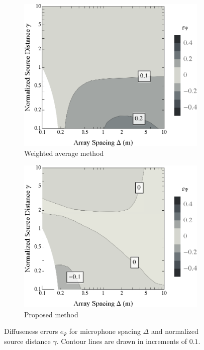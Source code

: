 \begin{figure}[t]
    	\centering
    	\begin{subfigure}[b]{0.49\textwidth}
        		\includegraphics[width=\textwidth]{08_proposed_method/figures/merimaa2005_d_contour_xf.eps}
        		\caption{Weighted average method}
        		\label{fig:08_Proposed_Method:Diffuseness_Errors:XF}
    	\end{subfigure}
	\hfill
	\begin{subfigure}[b]{0.49\textwidth}
        		\includegraphics[width=\textwidth]{08_proposed_method/figures/merimaa2005_d_contour_validhybrid.eps}
        		\caption{Proposed method}
        		\label{fig:08_Proposed_Method:Diffuseness_Errors:Hybrid}
    	\end{subfigure}
	
    	\caption[Contour plots of diffuseness errors for each interpolation method.]{
	Diffuseness errors $e_\Psi$ for microphone spacing $\Delta$ and normalized source distance $\gamma$.
  Contour lines are drawn in increments of $0.1$.}
    	\label{fig:08_Proposed_Method:Diffuseness_Errors}
\end{figure}


